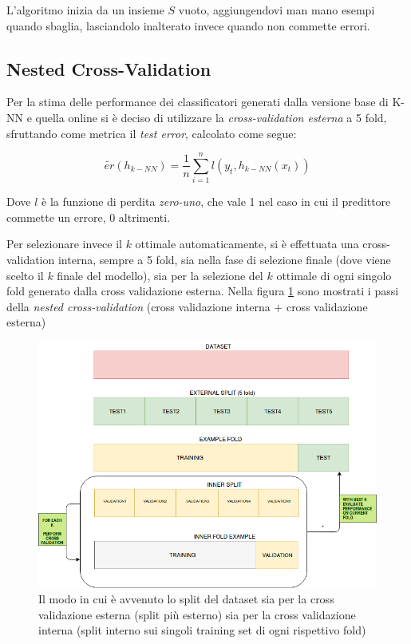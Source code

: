 \documentclass[fleqn,10pt]{SelfArx} %
\begin{document}
L'algoritmo inizia da un insieme $S$ vuoto, aggiungendovi man mano esempi quando sbaglia, lasciandolo inalterato invece quando non commette errori.

\subsection{Nested Cross-Validation}
Per la stima delle performance dei classificatori generati dalla versione base di K-NN e quella online si è deciso di utilizzare la \emph{cross-validation esterna} a 5 fold, sfruttando come metrica il \emph{test error}, calcolato come segue:

\[\widetilde{er}(h_{k-NN})=\frac{1}{n}\sum_{i=1}^{n} l(y_t,h_{k-NN}(x_t))\]

Dove $l$ è la funzione di perdita \emph{zero-uno}, che vale 1 nel caso in cui il predittore commette un errore, 0 altrimenti.
\newline

Per selezionare invece il $k$ ottimale automaticamente, si è effettuata una cross-validation interna, sempre a 5 fold, sia nella fase di selezione finale (dove viene scelto il $k$ finale del modello), sia per la selezione del $k$ ottimale di ogni singolo fold generato dalla cross validazione esterna. Nella figura \ref{cross} sono mostrati i passi della \emph{nested cross-validation} (cross validazione interna + cross validazione esterna)
\begin{figure}
\includegraphics[scale=0.33]{cross.png}
\caption{\footnotesize{Il modo in cui è avvenuto lo split del dataset sia per la cross validazione esterna (split più esterno) sia per la cross validazione interna (split interno sui singoli training set di ogni rispettivo fold)}}
\label{cross}
\end{figure}
\end{document}
